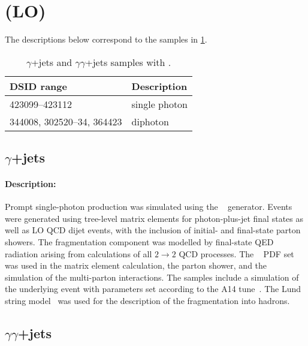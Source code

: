 \section[Pythia (LO)]{\PYTHIA (LO)}

The descriptions below correspond to the samples in \cref{tab:gammajets-pythia-lo}.

\begin{table}[!htbp]
  \caption{\(\gamma\)+jets and  \(\gamma\gamma\)+jets samples with \PYTHIA.}%
  \label{tab:gammajets-pythia-lo}
  \centering
  \begin{tabular}{l l}
    \toprule
    DSID range & Description \\
    \midrule
    423099--423112 & single photon \\
    344008, 302520--34, 364423 & diphoton \\
    \bottomrule
  \end{tabular}
\end{table}


\subsection[y+jets]{\(\gamma\)+jets}

\paragraph{Description:}

Prompt single-photon production was simulated using the \PYTHIA[8.186]~\cite{Sjostrand:2007gs} generator.
Events were generated using tree-level matrix elements for photon-plus-jet final
states as well as LO QCD dijet events, with the inclusion of initial-
and final-state parton showers. The fragmentation component was
modelled by final-state QED radiation arising from calculations of all
\(2\rightarrow 2\) QCD processes. The \NNPDF[2.3lo]~\cite{Ball:2012cx} PDF
set was used in the matrix element calculation, the parton shower, and
the simulation of the multi-parton interactions. The samples
include a simulation of the underlying event with parameters set
according to the A14 tune~\cite{ATL-PHYS-PUB-2014-021}. The Lund
string model~\cite{Andersson:1983ia,Sjostrand:1984ic} was used for the
description of the fragmentation into hadrons.


\subsection[yy+jets]{ \(\gamma\gamma\)+jets}

